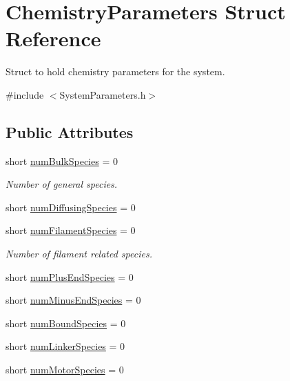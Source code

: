 \hypertarget{structChemistryParameters}{\section{Chemistry\+Parameters Struct Reference}
\label{structChemistryParameters}
}


Struct to hold chemistry parameters for the system.  




{\ttfamily \#include $<$System\+Parameters.\+h$>$}

\subsection*{Public Attributes}
{\bf }\par
\begin{DoxyCompactItemize}
\item 
short \hyperlink{structChemistryParameters_a33f49ae4bed264d303989b7372b1ba4b}{num\+Bulk\+Species} = 0
\begin{DoxyCompactList}\small\item\em Number of general species. \end{DoxyCompactList}\item 
short \hyperlink{structChemistryParameters_a78116d90c15faebd400cb5c75ce00e26}{num\+Diffusing\+Species} = 0
\end{DoxyCompactItemize}

{\bf }\par
\begin{DoxyCompactItemize}
\item 
short \hyperlink{structChemistryParameters_aa3ff68ed0be86482f1ea6d40b9d0fa1c}{num\+Filament\+Species} = 0
\begin{DoxyCompactList}\small\item\em Number of filament related species. \end{DoxyCompactList}\item 
short \hyperlink{structChemistryParameters_a14a3adb276b758bb6f2e5d0a27f80b15}{num\+Plus\+End\+Species} = 0
\item 
short \hyperlink{structChemistryParameters_a13d911b0639656b466b1ea13be22be00}{num\+Minus\+End\+Species} = 0
\item 
short \hyperlink{structChemistryParameters_a47fbf96b070976e8e0b7bb25a381ea54}{num\+Bound\+Species} = 0
\item 
short \hyperlink{structChemistryParameters_af82c8c5d13f1e092d9eb69a7e8e3b5a4}{num\+Linker\+Species} = 0
\item 
short \hyperlink{structChemistryParameters_a6aecadee2f3bb6bc436395473447c485}{num\+Motor\+Species} = 0
\end{DoxyCompactItemize}



